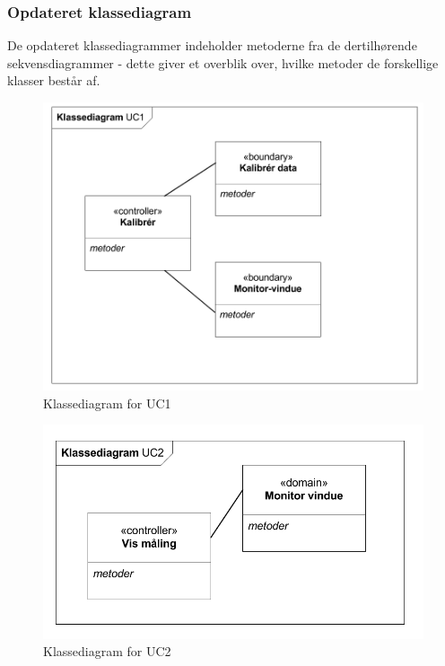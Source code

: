 \subsubsection{Opdateret klassediagram}
De opdateret klassediagrammer indeholder metoderne fra de dertilhørende  sekvensdiagrammer - dette giver et overblik over, hvilke metoder de forskellige klasser består af.

\begin{figure}[H]
	\centering
	\includegraphics[width=1\textwidth]{Figurer/Snip20151102_15}
	\caption{Klassediagram for UC1}
\end{figure}

\begin{figure}[H]
	\centering
	\includegraphics[width=1\textwidth]{Figurer/Snip20151102_16}
	\caption{Klassediagram for UC2}
\end{figure}

